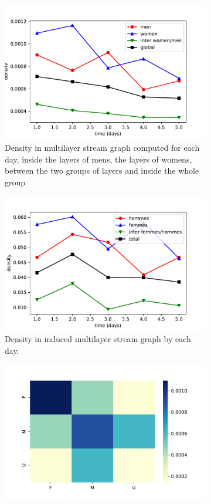 \documentclass{svproc}
\begin{document}
\begin{figure}
	\begin{subfigure}{0.45\textwidth}
	\includegraphics[width=\textwidth]{img/lycee/compfg.pdf}
	\caption{Density in multilayer stream graph computed for each day, inside the layers of mens, the layers of womens, between the two groups of layers and inside the whole group}
	\end{subfigure}
	\begin{subfigure}{0.45\textwidth}
	\includegraphics[width=\textwidth]{img/lycee/densitesj.pdf}
	\caption{Density in induced multilayer stream graph by each day. }
	\end{subfigure}
	\begin{subfigure}{0.45\textwidth}
	\includegraphics[width=\textwidth]{img/lycee/matricegenres.pdf}

\end{subfigure}
\end{figure}
\end{document}
